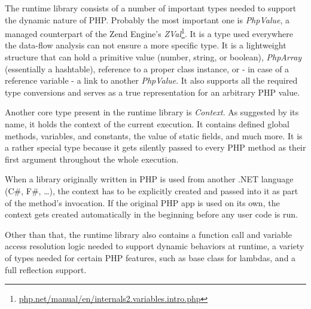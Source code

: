 The runtime library consists of a number of important types needed to support the dynamic nature of PHP. Probably the most important one is \emph{PhpValue}, a managed counterpart of the Zend Engine’s \emph{ZVal}\footnote{\href{http://php.net/manual/en/internals2.variables.intro.php}{php.net/manual/en/internals2.variables.intro.php}}. It is a type used everywhere the data-flow analysis can not ensure a more specific type. It is a lightweight structure that can hold a primitive value (number, string, or boolean), \emph{PhpArray} (essentially a hashtable), reference to a proper class instance, or - in case of a reference variable - a link to another \emph{PhpValue}. It also supports all the required type conversions and serves as a true representation for an arbitrary PHP value.

Another core type present in the runtime library is \emph{Context}. As suggested by its name, it holds the context of the current execution. It contains defined global methods, variables, and constants, the value of static fields, and much more. It is a rather special type because it gets silently passed to every PHP method as their first argument throughout the whole execution.

When a library originally written in PHP is used from another .NET language (C\#, F\#, …), the context has to be explicitly created and passed into it as part of the method's invocation. If the original PHP app is used on its own, the context gets created automatically in the beginning before any user code is run.

Other than that, the runtime library also contains a function call and variable access resolution logic needed to support dynamic behaviors at runtime, a variety of types needed for certain PHP features, such as base class for lambdas, and a full reflection support. 
